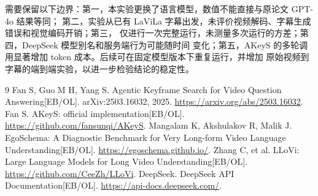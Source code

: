 \documentclass[12pt,UTF8]{ctexart}
\begin{document}
需要保留以下边界：第一，本实验更换了语言模型，数值不能直接与原论文 GPT-4o 结果等同；
第二，实验从已有 LaViLa 字幕出发，未评价视频解码、字幕生成错误和视觉编码开销；第三，
仅进行一次完整运行，未测量多次运行的方差；第四，DeepSeek 模型别名和服务端行为可能随时间
变化；第五，AKeyS 的多轮调用显著增加 token 成本。后续可在固定模型版本下重复运行，并增加
原始视频到字幕的端到端实验，以进一步检验结论的稳定性。

\begin{thebibliography}{9}
 Fan S, Guo M H, Yang S. Agentic Keyframe Search for Video Question
  Answering[EB/OL]. arXiv:2503.16032, 2025. \url{https://arxiv.org/abs/2503.16032}.
 Fan S. AKeyS: official implementation[EB/OL].
  \url{https://github.com/fansunqi/AKeyS}.
 Mangalam K, Akshulakov R, Malik J. EgoSchema: A Diagnostic Benchmark
  for Very Long-form Video Language Understanding[EB/OL].
  \url{https://egoschema.github.io/}.
 Zhang C, et al. LLoVi: Large Language Models for Long Video
  Understanding[EB/OL]. \url{https://github.com/CeeZh/LLoVi}.
 DeepSeek. DeepSeek API Documentation[EB/OL].
  \url{https://api-docs.deepseek.com/}.
\end{thebibliography}
\end{document}
